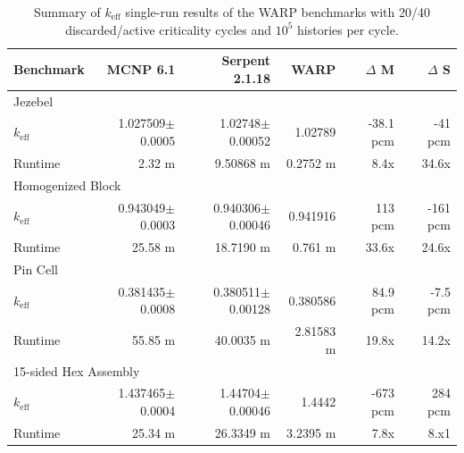 \begin{table}[h]
\centering
\caption{Summary of $k_\mathrm{eff}$ single-run results of the WARP benchmarks with 20/40 discarded/active criticality cycles and $10^5$ histories per cycle.}
\label{benchmark_summary}
\begin{tabular}{| l | r | r | r | r | r |}
 \hline
 Benchmark & MCNP 6.1 & Serpent 2.1.18 & WARP & $\Delta$ M & $\Delta$ S  \\
\hline
\hline
\multicolumn{6}{|l|}{Jezebel}  \\
\hline
 $k_\mathrm{eff}$ & 1.027509$\pm$0.0005 & 1.02748$\pm$0.00052 & 1.02789 & -38.1 pcm & -41 pcm  \\
 \hline
 Runtime               & 2.32 m & 9.50868 m & 0.2752 m & 8.4x  & 34.6x  \\
 \hline
 \hline
\multicolumn{6}{|l|}{Homogenized Block }\\
\hline
 $k_\mathrm{eff}$ & 0.943049$\pm$0.0003 & 0.940306$\pm$0.00046 & 0.941916 & 113 pcm & -161 pcm   \\
 \hline
 Runtime               &  25.58 m & 18.7190 m & 0.761 m & 33.6x  & 24.6x  \\
 \hline
  \hline
\multicolumn{6}{|l|}{Pin Cell}\\
\hline
 $k_\mathrm{eff}$ & 0.381435$\pm$0.0008 &  0.380511$\pm$0.00128 & 0.380586 & 84.9 pcm &  -7.5 pcm    \\
 \hline
 Runtime               & 55.85 m & 40.0035 m &  2.81583 m &  19.8x & 14.2x  \\
 \hline
  \hline
\multicolumn{6}{|l|}{15-sided Hex Assembly}\\
\hline
 $k_\mathrm{eff}$ & 1.437465$\pm$0.0004 & 1.44704$\pm$0.00046 & 1.4442 & -673 pcm & 284 pcm  \\
 \hline
 Runtime               & 25.34 m &  26.3349 m &  3.2395 m  & 7.8x & 8.x1  \\
 \hline
\end{tabular}
\end{table}


